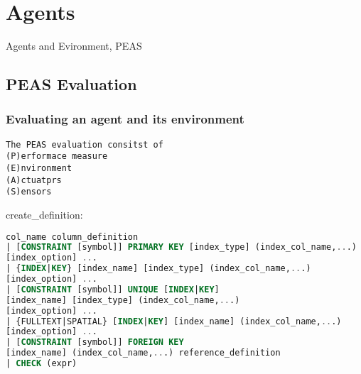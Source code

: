 \section{Agents}
Agents and Evironment, PEAS

\subsection*{PEAS Evaluation}
\subsubsection*{Evaluating an agent and its environment}
\begin{lstlisting}
The PEAS evaluation consitst of 
(P)erformace measure
(E)nvironment
(A)ctuatprs
(S)ensors
\end{lstlisting}

create\_definition:

\begin{lstlisting}[language=SQL]
col_name column_definition
| [CONSTRAINT [symbol]] PRIMARY KEY [index_type] (index_col_name,...)
[index_option] ...
| {INDEX|KEY} [index_name] [index_type] (index_col_name,...)
[index_option] ...
| [CONSTRAINT [symbol]] UNIQUE [INDEX|KEY]
[index_name] [index_type] (index_col_name,...)
[index_option] ...
| {FULLTEXT|SPATIAL} [INDEX|KEY] [index_name] (index_col_name,...)
[index_option] ...
| [CONSTRAINT [symbol]] FOREIGN KEY
[index_name] (index_col_name,...) reference_definition
| CHECK (expr)
\end{lstlisting}